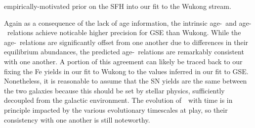 \documentclass[ms.tex]{subfiles}
\begin{document}
empirically-motivated prior on the SFH into our fit to the Wukong stream.
\par
Again as a consequence of the lack of age information, the intrinsic
age-\feh~and age-\afe~relations achieve noticable higher precision for GSE
than Wukong.
While the age-\feh~relations are significantly offset from one another due to
differences in their equilibrium abundances, the predicted age-\afe~relations
are remarkably consistent with one another.
A portion of this agreement can likely be traced back to our fixing the Fe
yields in our fit to Wukong to the values inferred in our fit to GSE.
Nonetheless, it is reasonable to assume that the SN yields are the same between
the two galaxies because this should be set by stellar physics, sufficiently
decoupled from the galactic environment.
The evolution of~\afe~with time is in principle impacted by the various
evolutionary timescales at play, so their consistency with one another is still
noteworthy.
\end{document}
